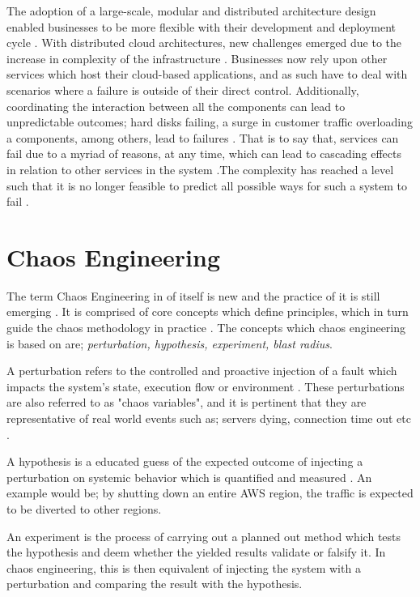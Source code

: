 \documentclass{article}
\begin{document}
The adoption of a large-scale, modular and distributed architecture design enabled businesses to be more flexible with their development and deployment cycle \cite{principlesOfChaos}\cite{GremlinPaper}.
With distributed cloud architectures, new challenges emerged due to the increase in complexity of the infrastructure \cite{GremlinPaper}\cite{chaosEngineeringGremlin}. Businesses now rely upon other services which host their cloud-based applications, and as such have to deal with scenarios where a failure is outside of their direct control. Additionally, coordinating the interaction between all the components can lead to unpredictable outcomes; hard disks failing, a surge in customer traffic overloading a components, among others, lead to failures \cite{OreillyChaos}\cite{principlesOfChaos}. That is to say that, services can fail due to a myriad of reasons, at any time, which can lead to cascading effects in relation to other services in the system \cite{microserivces}\cite{principlesOfChaos}.The complexity has reached a level such that it is no longer feasible to predict all possible ways for such a system to fail \cite{GremlinPaper}\cite{OreillyChaos}.


\section{Chaos Engineering}
The term Chaos Engineering in of itself is new and the practice of it is still emerging \cite{OreillyChaos}. It is comprised of core concepts which define principles, which in turn guide the chaos methodology in practice \cite{chaosJVM}\cite{OreillyChaos}. The concepts which chaos engineering is based on are; \textit{perturbation, hypothesis, experiment, blast radius}.

A perturbation refers to the controlled and proactive injection of a fault which impacts the system's state, execution flow or environment \cite{chaosJVM}. These perturbations are also referred to as "chaos variables", and it is pertinent that they are representative of real world events such as; servers dying, connection time out etc \cite{chaosJVM}\cite{principlesOfChaos}.

A hypothesis is a educated guess of the expected outcome of injecting a perturbation on systemic behavior which is quantified and measured \cite{chaosJVM}\cite{OreillyChaos}. An example would be; by shutting down an entire AWS region, the traffic is expected to be diverted to other regions.

An experiment is the process of carrying out a planned out method which tests the hypothesis and deem whether the yielded results validate or falsify it. In chaos engineering, this is then equivalent of injecting the system with a perturbation and comparing the result with the hypothesis.
\end{document}
